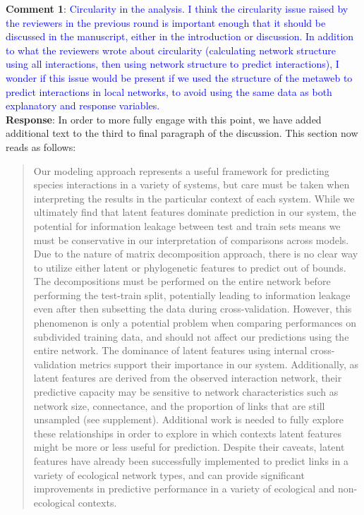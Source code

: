 \documentclass{article}
\begin{document}
\textbf{Comment 1}: \textcolor{blue}{Circularity in the analysis.}
    \textcolor{blue}{I think the circularity issue raised by the reviewers in the previous round is important enough that it should be discussed in the manuscript, either in the introduction or discussion. In addition to what the reviewers wrote about circularity (calculating network structure using all interactions, then using network structure to predict interactions), I wonder if this issue would be present if we used the structure of the metaweb to predict interactions in local networks, to avoid using the same data as both explanatory and response variables.}
    \\
    \textbf{Response}: In order to more fully engage with this point, we have added additional text to the third to final paragraph of the discussion. This section now reads as follows: 
    \begin{quote}
            Our modeling approach represents a useful framework for predicting species interactions in a variety of systems, but care must be taken when interpreting the results in the particular context of each system. While we ultimately find that latent features dominate prediction in our system, the potential for information leakage between test and train sets means we must be conservative in our interpretation of comparisons across models. Due to the nature of matrix decomposition approach, there is no clear way to utilize either latent or phylogenetic features to predict out of bounds. The decompositions must be performed on the entire network before performing the test-train split, potentially leading to information leakage even after then subsetting the data during cross-validation. However, this phenomenon is only a potential problem when comparing performances on subdivided training data, and should not affect our predictions using the entire network. The dominance of latent features using internal cross-validation metrics support their importance in our system. Additionally, as latent features are derived from the observed interaction network, their predictive capacity may be sensitive to network characteristics such as network size, connectance, and the proportion of links that are still unsampled (see supplement). Additional work is needed to fully explore these relationships in order to explore in which contexts latent features might be more or less useful for prediction. Despite their caveats, latent features have already been successfully implemented to predict links in a variety of ecological network types, and can provide significant improvements in predictive performance in a variety of ecological\cite{banville2023constrains, poisot2021imputing, poisot2023network, nunes2024estimated} and non-ecological \cite{yeung2002reverse, wu2019prediction, zeng2020sdlda} contexts.
    \end{quote}
\end{document}
